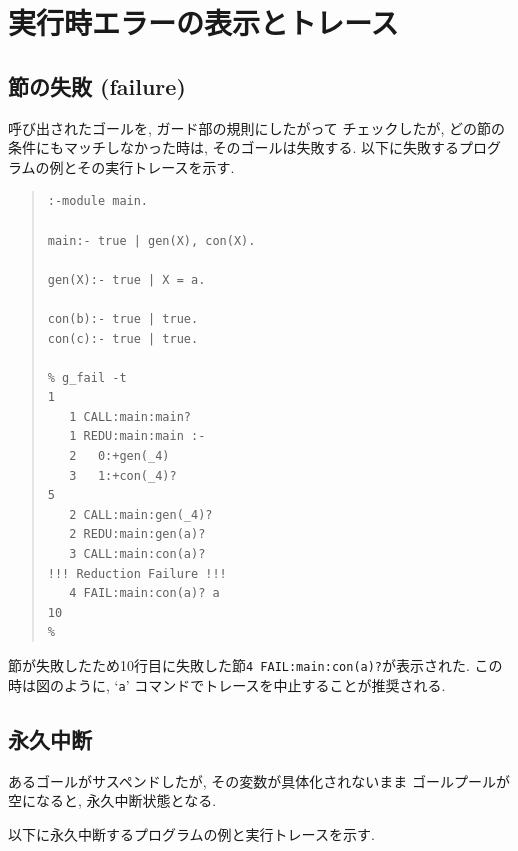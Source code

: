 \documentclass[a4,titlepage]{jsreport}
\begin{document}
\section{実行時エラーの表示とトレース}

\subsection{節の失敗 (failure)}

呼び出されたゴールを, ガード部の規則にしたがって
チェックしたが, どの節の条件にもマッチしなかった時は, そのゴールは失敗する.  
以下に失敗するプログラムの例とその実行トレースを示す.  

\begin{quote}%
\begin{Verbatim}[frame=single,baselinestretch=0.8]
:-module main.

main:- true | gen(X), con(X).

gen(X):- true | X = a.

con(b):- true | true.
con(c):- true | true.

% g_fail -t                                                        1
   1 CALL:main:main? 
   1 REDU:main:main :-
   2   0:+gen(_4)
   3   1:+con(_4)?                                                 5
   2 CALL:main:gen(_4)? 
   2 REDU:main:gen(a)? 
   3 CALL:main:con(a)? 
!!! Reduction Failure !!!
   4 FAIL:main:con(a)? a                                          10
% 
\end{Verbatim}
\end{quote}%

節が失敗したため10行目に失敗した節{\tt 4 FAIL:main:con(a)?}が表示された.  
この時は図のように, `{\tt a}' コマンドでトレースを中止することが推奨される.

\subsection{永久中断}

あるゴールがサスペンドしたが, その変数が具体化されないまま
ゴールプールが空になると, 永久中断状態となる.  

以下に永久中断するプログラムの例と実行トレースを示す.  
\end{document}
